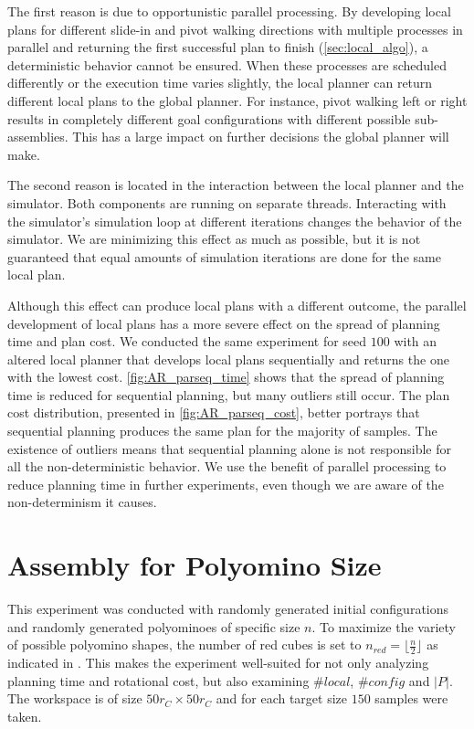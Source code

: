 The first reason is due to opportunistic parallel processing.
By developing local plans for different slide-in and pivot walking directions with multiple processes in parallel and returning the first successful plan to finish (\autoref{sec:local_algo}), a deterministic behavior cannot be ensured.
When these processes are scheduled differently or the execution time varies slightly, the local planner can return different local plans to the global planner.
For instance, pivot walking left or right results in completely different goal configurations with different possible sub-assemblies.
This has a large impact on further decisions the global planner will make.

The second reason is located in the interaction between the local planner and the simulator.
Both components are running on separate threads.
Interacting with the simulator's simulation loop at different iterations changes the behavior of the simulator.
We are minimizing this effect as much as possible, but it is not guaranteed that equal amounts of simulation iterations are done for the same local plan.

Although this effect can produce local plans with a different outcome, the parallel development of local plans has a more severe effect on the spread of planning time and plan cost.
We conducted the same experiment for seed $100$ with an altered local planner that develops local plans sequentially and returns the one with the lowest cost.
\autoref{fig:AR_parseq_time} shows that the spread of planning time is reduced for sequential planning, but many outliers still occur.
The plan cost distribution, presented in \autoref{fig:AR_parseq_cost}, better portrays that sequential planning produces the same plan for the majority of samples.
The existence of outliers means that sequential planning alone is not responsible for all the non-deterministic behavior.
We use the benefit of parallel processing to reduce planning time in further experiments, even though we are aware of the non-determinism it causes.


\section{Assembly for Polyomino Size}
\label{sec:AFN}

This experiment was conducted with randomly generated initial configurations and randomly generated polyominoes of specific size $n$.
To maximize the variety of possible polyomino shapes, the number of red cubes is set to $n_\textit{red} = \lfloor \frac{n}{2} \rfloor$ as indicated in \cite{Lu2021}.
This makes the experiment well-suited for not only analyzing planning time and rotational cost, but also examining $\#\textit{local}$, $\#\textit{config}$ and $|P|$.
The workspace is of size $50 r_C \times 50 r_C$ and for each target size $150$ samples were taken.


